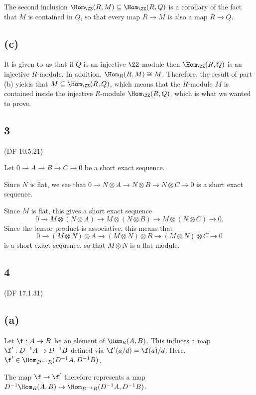 \documentclass[12pt, reqno]{amsart}
\begin{document}
The second inclusion $\Hom_\ZZ (R, M) \subseteq \Hom_\ZZ (R, Q)$ is a corollary
of the fact that $M$ is contained in $Q$, so that every map $R \to M$ is also a
map $R \to Q$.

\subsection*{(c)}

It is given to us that if $Q$ is an injective $\ZZ$-module then $\Hom_{\ZZ} (R,
Q)$ is an injective $R$-module. In addition, $\Hom_R (R, M) \cong M$.
Therefore, the result of part (b) yields that 
$M \subseteq \Hom_{\ZZ} (R, Q)$, which means that the $R$-module $M$ is
contained inside the injective $R$-module $\Hom_{\ZZ} (R, Q)$, which is what we
wanted to prove.

\subsection*{3} (DF 10.5.21)

Let $0 \to A \to B \to C \to 0$ be a short exact sequence.

Since $N$ is flat, we see that 
$0 \to N \otimes A \to N \otimes B \to N \otimes C \to 0$ 
is a short exact sequence.

Since $M$ is flat, this gives a short exact sequence
$$0 \to M \otimes (N \otimes A) \to M \otimes (N \otimes B) \to M \otimes (N
\otimes C) \to 0.$$ 
Since the tensor product is associative, this means that 
$$0 \to (M \otimes N) \otimes A \to (M \otimes N) \otimes B \to (M \otimes N)
\otimes C \to 0$$ 
is a short exact sequence, so that $M \otimes N$ is a flat
module.


\subsection*{4} (DF 17.1.31)
\subsection*{(a)}
Let $\f : A \to B$ be an element of $\Hom_R(A, B)$. 
This induces a map $\f' : D^{-1}A \to D^{-1}B$ defined via 
$\f'(a/d) = \f(a) / d$. Here, $\f' \in \Hom_{D^{-1}R} (D^{-1}A, D^{-1}B)$.

The map $\f \to \f'$ therefore represents a map
$D^{-1} \Hom_R(A, B) \to \Hom_{D^{-1}R}(D^{-1}A, D^{-1}B)$.
\end{document}

